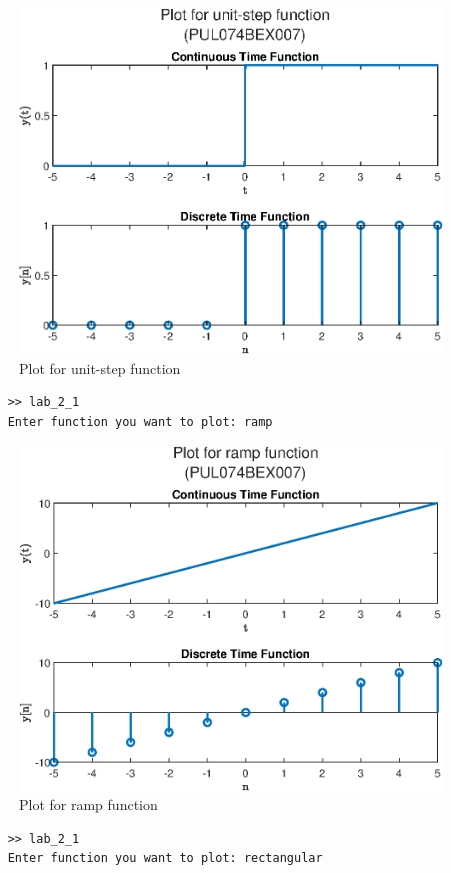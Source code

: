 \documentclass{lab_sheet}
\begin{document}
\begin{figure}[H]
    \centering
    \includegraphics[width=0.85\linewidth]{../Figures/unit-step.eps}
    \caption{Plot for unit-step function}
    \label{fig:2_1_b}
\end{figure}

\pagebreak
\begin{verbatim}
    >> lab_2_1
    Enter function you want to plot: ramp
\end{verbatim}
\begin{figure}[H]
    \centering
    \includegraphics[width=0.85\linewidth]{../Figures/ramp.eps}
    \caption{Plot for ramp function}
    \label{fig:2_1_c}
\end{figure}
\pagebreak
\begin{verbatim}
    >> lab_2_1
    Enter function you want to plot: rectangular
\end{verbatim}
\end{document}

